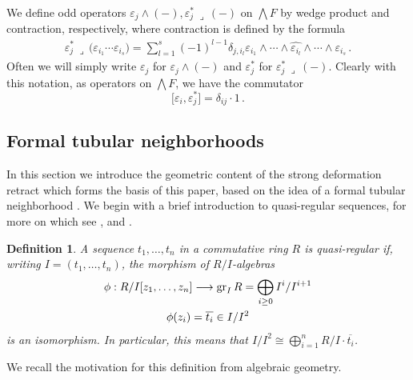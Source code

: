 \documentclass[english,letter paper,12pt,leqno]{article}
\theoremstyle{example}
\newtheorem{definition}[theorem]{Definition}
\numberwithin{equation}{section}
\def\be{\begin{equation}}
\def\ee{\end{equation}}
\begin{document}
We define odd operators $\varepsilon_j \wedge (-), \varepsilon_j^* \,\lrcorner\, (-)$ on $\bigwedge F$ by wedge product and contraction, respectively, where contraction is defined by the formula
\begin{align*}
\varepsilon_j^* \,\lrcorner\, \Big( \varepsilon_{i_1} \cdots \varepsilon_{i_s} \Big) = \sum_{l=1}^s (-1)^{l-1} \delta_{j, i_l} \varepsilon_{i_1} \wedge \cdots \wedge \widehat{ \varepsilon_{i_l} } \wedge \cdots \wedge \varepsilon_{i_s}\,.
\end{align*}
Often we will simply write $\varepsilon_j$ for $\varepsilon_j \wedge (-)$ and $\varepsilon_j^*$ for $\varepsilon_j^* \,\lrcorner\, (-)$. Clearly with this notation, as operators on $\bigwedge F$, we have the commutator
\be\label{eq:wedge_contract_comm}
\big[ \varepsilon_i, \varepsilon_j^* \big] = \delta_{ij} \cdot 1\,.
\ee

\subsection{Formal tubular neighborhoods}

In this section we introduce the geometric content of the strong deformation retract which forms the basis of this paper, based on the idea of a formal tubular neighborhood \cite{cuntzquillen, lipman}. We begin with a brief introduction to quasi-regular sequences, for more on which see \cite[\S 15.B]{matsumura}, \cite[Chapitre $0$ \S 15.1]{EGA4} and \cite[Section\,10.68]{stacks_project}.

\begin{definition} A sequence $t_1,\ldots,t_n$ in a commutative ring $R$ is \emph{quasi-regular} if, writing $I = (t_1,\ldots,t_n)$, the morphism of $R/I$-algebras
\begin{gather*}
\phi: R/I[z_1,\ldots,z_n] \longrightarrow \operatorname{gr}_I R = \bigoplus_{i \ge 0} I^i / I^{i+1}\\
\phi(z_i) = \overline{t_i} \in I/I^2
\end{gather*}
is an isomorphism. In particular, this means that $I/I^2 \cong \bigoplus_{i=1}^n R/I \cdot \overline{t_i}$.
\end{definition}

We recall the motivation for this definition from algebraic geometry.
\end{document}
